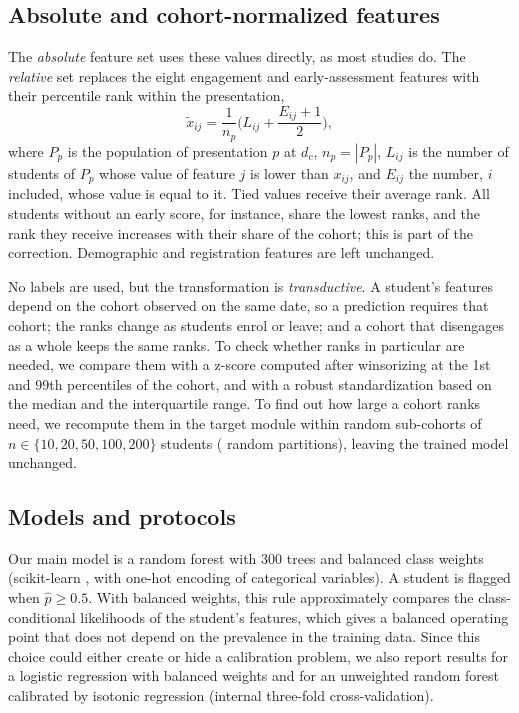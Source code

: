 \documentclass[journal]{IEEEtran}
\begin{document}
\subsection{Absolute and cohort-normalized features}
The \emph{absolute} feature set uses these values directly, as most studies do. The \emph{relative} set replaces the eight engagement and early-assessment features with their percentile rank within the presentation,
\begin{equation}
\tilde{x}_{ij} = \frac{1}{n_p}\Big(L_{ij} + \frac{E_{ij}+1}{2}\Big),
\label{eq:rank}
\end{equation}
where $P_p$ is the population of presentation $p$ at $d_c$, $n_p=|P_p|$, $L_{ij}$ is the number of students of $P_p$ whose value of feature $j$ is lower than $x_{ij}$, and $E_{ij}$ the number, $i$ included, whose value is equal to it. Tied values receive their average rank. All students without an early score, for instance, share the lowest ranks, and the rank they receive increases with their share of the cohort; this is part of the correction. Demographic and registration features are left unchanged.

No labels are used, but the transformation is \emph{transductive}. A student's features depend on the cohort observed on the same date, so a prediction requires that cohort; the ranks change as students enrol or leave; and a cohort that disengages as a whole keeps the same ranks. To check whether ranks in particular are needed, we compare them with a z-score computed after winsorizing at the 1st and 99th percentiles of the cohort, and with a robust standardization based on the median and the interquartile range. To find out how large a cohort ranks need, we recompute them in the target module within random sub-cohorts of $n\in\{10,20,50,100,200\}$ students (\resNPartitions{} random partitions), leaving the trained model unchanged.

\subsection{Models and protocols}
Our main model is a random forest \cite{breiman2001rf} with 300 trees and balanced class weights (scikit-learn \cite{pedregosa2011sklearn}, with one-hot encoding of categorical variables). A student is flagged when $\hat{p}\geq 0.5$. With balanced weights, this rule approximately compares the class-conditional likelihoods of the student's features, which gives a balanced operating point that does not depend on the prevalence in the training data. Since this choice could either create or hide a calibration problem, we also report results for a logistic regression with balanced weights and for an unweighted random forest calibrated by isotonic regression (internal three-fold cross-validation).
\end{document}
